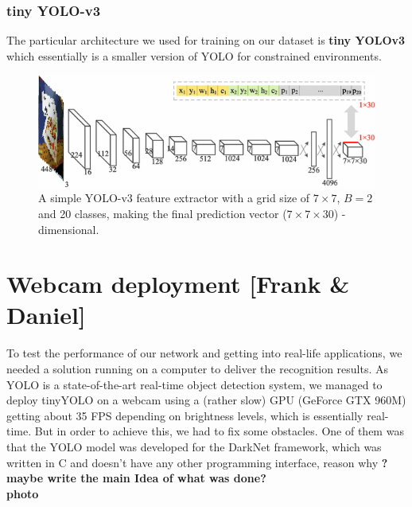 \documentclass[a4paper]{article}
\begin{document}
\subsubsection*{tiny YOLO-v3}

The particular architecture we used for training on our dataset is \textbf{tiny YOLOv3} which essentially is a smaller version of YOLO for constrained environments.
\begin{figure}[h]
\includegraphics[width=1\linewidth]{images/tinyyolo}
\caption{A simple YOLO-v3 feature extractor with a grid size of $7\times 7$, $B=2$ and 20 classes, making the final prediction vector ($7 \times 7 \times 30$) - dimensional. }
\end{figure}
\newpage


\section{Webcam deployment [Frank \& Daniel]}
To test the performance of our network and getting into real-life applications, we needed a solution running on a computer to deliver the recognition results. As YOLO is a state-of-the-art real-time object detection system, we managed to deploy tinyYOLO on a webcam using a (rather slow) GPU (GeForce GTX 960M) getting about 35 FPS depending on brightness levels, which is essentially real-time.  But in order to achieve this, we had to fix some obstacles.  One of them was that the YOLO model was developed for the DarkNet framework, which was written in C and doesn't have any other programming interface, reason why \textbf{? maybe write the main Idea of what was done?}  \\ \textbf{photo}
\end{document}
